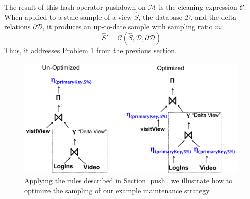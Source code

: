 


\vspace{0.25em}

The result of this hash operator pushdown on $\mathcal{M}$ is the cleaning expression $\mathcal{C}$. 
When applied to a stale sample of a view $\widehat{S}$, the database $\mathcal{D}$, and the delta relations $\partial \mathcal{D}$, it produces an up-to-date sample with sampling ratio $m$:
\[
\widehat{S}' = \mathcal{C}(\widehat{S},\mathcal{D},\partial \mathcal{D})
\]
Thus, it addresses Problem 1 from the previous section.

\begin{figure}[t] \vspace{-2em}
\centering
 \includegraphics[scale=0.24]{figs/example_expression_tree_2.pdf} \vspace{-.5em}
 \caption{Applying the rules described in Section \ref{push}, we illustrate how to optimize the sampling of our example maintenance strategy. \label{exexpr2}}\vspace{-1em}
\end{figure}

